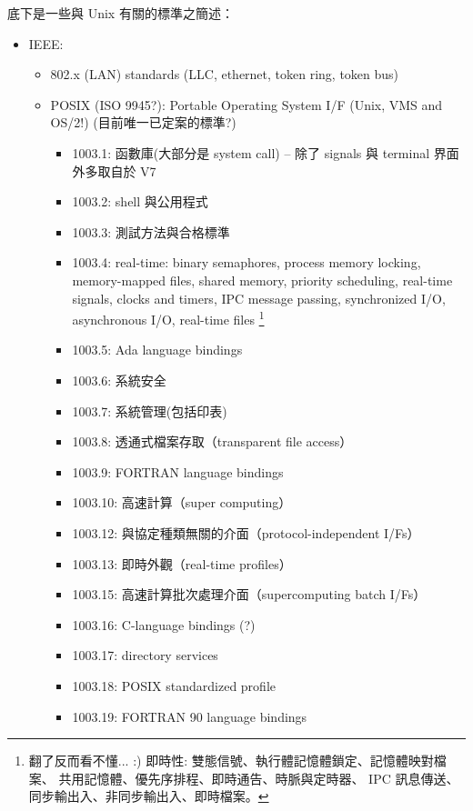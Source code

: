 \documentclass{article}
\begin{document}
\begin{CJK*}{Bg5}{ming}
{     底下是一些與 Unix 有關的標準之簡述：

\begin{itemize}
      \item IEEE:
      \begin{itemize}
        \item 802.x (LAN) standards (LLC, ethernet, token ring, token bus)
        \item  POSIX (ISO 9945?): Portable Operating System I/F (Unix, VMS
          and OS/2!) (目前唯一已定案的標準?)
        \begin{itemize}
          \item 1003.1:  函數庫(大部分是 system call) -- 除了 signals 與 
		     terminal 界面外多取自於 V7
          \item 1003.2:  shell 與公用程式
          \item 1003.3:  測試方法與合格標準
          \item 1003.4:  real-time: binary semaphores, process memory
                     locking, memory-mapped files, shared memory,
                     priority scheduling, real-time signals, clocks and
                     timers, IPC message passing, synchronized I/O,
                     asynchronous I/O, real-time files
                     \footnote{翻了反而看不懂... :)
                     即時性: 雙態信號、執行體記憶體鎖定、記憶體映對檔案、
                     共用記憶體、優先序排程、即時通告、時脈與定時器、
                     IPC 訊息傳送、同步輸出入、非同步輸出入、即時檔案。}
          \item 1003.5:  Ada language bindings
          \item 1003.6:  系統安全
          \item 1003.7:  系統管理(包括印表)
          \item 1003.8:  透通式檔案存取（transparent file access）
          \item 1003.9:  FORTRAN language bindings
          \item 1003.10: 高速計算（super computing）
          \item 1003.12: 與協定種類無關的介面（protocol-independent I/Fs）
          \item 1003.13: 即時外觀（real-time profiles）
          \item 1003.15: 高速計算批次處理介面（supercomputing batch I/Fs）
          \item 1003.16: C-language bindings (?)
          \item 1003.17: directory services
          \item 1003.18: POSIX standardized profile
          \item 1003.19: FORTRAN 90 language bindings
        \end{itemize}
      \end{itemize}


\end{itemize}}
\end{CJK*}
\end{document}
